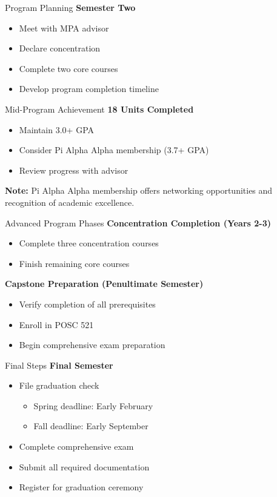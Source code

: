 \documentclass[10pt]{beamer}
\begin{document}
    \begin{frame}{Program Planning}
    \textbf{Semester Two}
    \begin{itemize}
    \item Meet with MPA advisor
    \item Declare concentration
    \item Complete two core courses
    \item Develop program completion timeline
    \end{itemize}
    \end{frame}
    
    \begin{frame}{Mid-Program Achievement}
    \textbf{18 Units Completed}
    \begin{itemize}
    \item Maintain 3.0+ GPA
    \item Consider Pi Alpha Alpha membership (3.7+ GPA)
    \item Review progress with advisor
    \end{itemize}
    
    \textbf{Note:} Pi Alpha Alpha membership offers networking opportunities and recognition of academic excellence.
    \end{frame}
    
    \begin{frame}{Advanced Program Phases}
    \textbf{Concentration Completion (Years 2-3)}
    \begin{itemize}
    \item Complete three concentration courses
    \item Finish remaining core courses
    \end{itemize}
    
    \textbf{Capstone Preparation (Penultimate Semester)}
    \begin{itemize}
    \item Verify completion of all prerequisites
    \item Enroll in POSC 521
    \item Begin comprehensive exam preparation
    \end{itemize}
    \end{frame}
    
    \begin{frame}{Final Steps}
    \textbf{Final Semester}
    \begin{itemize}
    \item File graduation check
        \begin{itemize}
        \item Spring deadline: Early February
        \item Fall deadline: Early September
        \end{itemize}
    \item Complete comprehensive exam
    \item Submit all required documentation
    \item Register for graduation ceremony
    \end{itemize}
    \end{frame}
    
\end{document}
